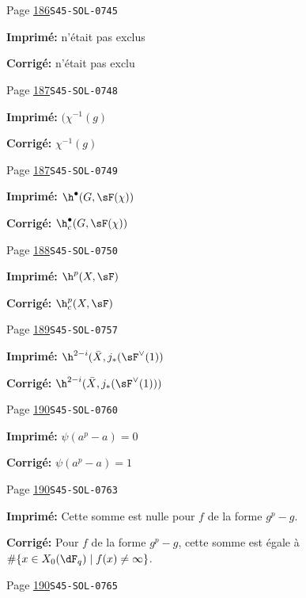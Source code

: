 \begin{description}
\smallskip
\item[\hypertarget{apparatus:FR-0154}{154}] Page \hyperlink{printpage:fr:186}{186}\quad\texttt{S45-SOL-0745}
\par\noindent\textbf{Imprimé:} n'était pas exclus
\par\noindent\textbf{Corrigé:} n'était pas exclu
\smallskip
\item[\hypertarget{apparatus:FR-0155}{155}] Page \hyperlink{printpage:fr:187}{187}\quad\texttt{S45-SOL-0748}
\par\noindent\textbf{Imprimé:} \((\chi^{-1}(g)\)
\par\noindent\textbf{Corrigé:} \(\chi^{-1}(g)\)
\smallskip
\item[\hypertarget{apparatus:FR-0156}{156}] Page \hyperlink{printpage:fr:187}{187}\quad\texttt{S45-SOL-0749}
\par\noindent\textbf{Imprimé:} \(\h^\bullet(G,\sF(\chi))\)
\par\noindent\textbf{Corrigé:} \(\h_c^\bullet(G,\sF(\chi))\)
\smallskip
\item[\hypertarget{apparatus:FR-0157}{157}] Page \hyperlink{printpage:fr:188}{188}\quad\texttt{S45-SOL-0750}
\par\noindent\textbf{Imprimé:} \(\h^p(X,\sF)\)
\par\noindent\textbf{Corrigé:} \(\h_c^p(X,\sF)\)
\smallskip
\item[\hypertarget{apparatus:FR-0158}{158}] Page \hyperlink{printpage:fr:189}{189}\quad\texttt{S45-SOL-0757}
\par\noindent\textbf{Imprimé:} \(\h^{2-i}(\bar X,j_\ast(\sF^\vee(1))\)
\par\noindent\textbf{Corrigé:} \(\h^{2-i}(\bar X,j_\ast(\sF^\vee(1)))\)
\smallskip
\item[\hypertarget{apparatus:FR-0159}{159}] Page \hyperlink{printpage:fr:190}{190}\quad\texttt{S45-SOL-0760}
\par\noindent\textbf{Imprimé:} \(\psi(a^p-a)=0\)
\par\noindent\textbf{Corrigé:} \(\psi(a^p-a)=1\)
\smallskip
\item[\hypertarget{apparatus:FR-0160}{160}] Page \hyperlink{printpage:fr:190}{190}\quad\texttt{S45-SOL-0763}
\par\noindent\textbf{Imprimé:} Cette somme est nulle pour $f$ de la forme $g^p-g$.
\par\noindent\textbf{Corrigé:} Pour $f$ de la forme $g^p-g$, cette somme est égale à $\#\{x\in X_0(\dF_q)\mid f(x)\ne\infty\}$.
\smallskip
\item[\hypertarget{apparatus:FR-0161}{161}] Page \hyperlink{printpage:fr:190}{190}\quad\texttt{S45-SOL-0765}

\end{description}
